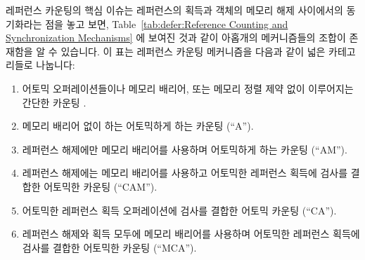 레퍼런스 카운팅의 핵심 이슈는 레퍼런스의 획득과 객체의 메모리 해제 사이에서의
동기화라는 점을 놓고 보면,
Table~\ref{tab:defer:Reference Counting and Synchronization Mechanisms} 에
보여진 것과 같이 아홉개의 메커니즘들의 조합이 존재함을 알 수 있습니다.
이 표는 레퍼런스 카운팅 메커니즘을 다음과 같이 넓은 카테고리들로 나눕니다:

\begin{enumerate}
\item	어토믹 오퍼레이션들이나 메모리 배리어, 또는 메모리 정렬 제약 없이
	이루어지는 간단한 카운팅 .
\item	메모리 배리어 없이 하는 어토믹하게 하는 카운팅 (``A'').
\item	레퍼런스 해제에만 메모리 배리어를 사용하며 어토믹하게 하는 카운팅
	(``AM'').
\item	레퍼런스 해제에는 메모리 배리어를 사용하고 어토믹한 레퍼런스 획득에
	검사를 결합한 어토믹한 카운팅 (``CAM'').
\item	어토믹한 레퍼런스 획득 오퍼레이션에 검사를 결합한 어토믹 카운팅
	(``CA'').
\item	레퍼런스 해제와 획득 모두에 메모리 배리어를 사용하며 어토믹한 레퍼런스
	획득에 검사를 결합한 어토믹한 카운팅 (``MCA'').

\end{enumerate}
